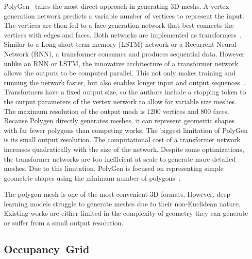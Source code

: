 PolyGen~\cite{Nash2020} takes the most direct approach in generating 3D meshs. A vertex generation network predicts a variable number of vertices to represent the input. The vertices are then fed to a face generation network that best connects the vertices with edges and faces. Both networks are implemented as transformers~\cite{Nash2020}. Similar to a Long short-term memory (LSTM) network or a Recurrent Neural Network (RNN), a transformer consumes and produces sequential data. However unlike  an RNN or LSTM, the innovative architecture of a transformer network allows the outputs to be computed parallel. This not only makes training and running the network faster, but also enables longer input and output sequences~\cite{Vaswani2017}. Transformers have a fixed output size, so the authors include a stopping token to the output parameters of the vertex network to allow for variable size meshes. The maximum resolution of the output mesh is 1200 vertices and 800 faces. Because Polygen directly generates meshes, it can represent geometric shapes with far fewer polygons than competing works. The biggest limitation of PolyGen is its small output resolution. The computational cost of a transformer network increases quadratically with the size of the network. Despite some optimizations, the transformer networks are too inefficient at scale to generate more detailed meshes. Due to this limitation, PolyGen is focused on representing simple geometric shapes using the minimum number of polygons~\cite{Nash2020}.

The polygon mesh is one of the most convenient 3D formats. However, deep learning models struggle to generate meshes due to their non-Euclidean nature. Existing works are either limited in the complexity of geometry they can generate or suffer from a small output resolution.

\newpage


\subsection{Occupancy~Grid}
\label{subsec:occupancy_grid}


